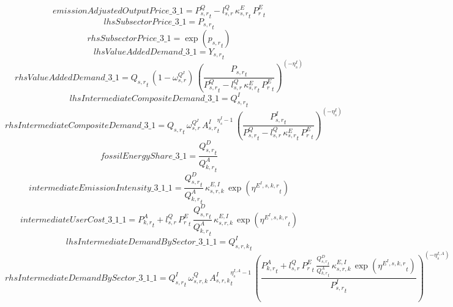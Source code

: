 \begin{dmath*}
emissionAdjustedOutputPrice\_3\_1 = {{P^Q_{s,r}}}_{t}-{{l^{Q}_{s,r}}}\, {{\kappa^{E}_{s,r}}}_{t}\, {{P^E_r}}_{t}
\end{dmath*}
\begin{dmath*}
lhsSubsectorPrice\_3\_1 = {{P_{s,r}}}_{t}
\end{dmath*}
\begin{dmath*}
rhsSubsectorPrice\_3\_1 = \exp\left({{p_{s,r}}}_{t}\right)
\end{dmath*}
\begin{dmath*}
lhsValueAddedDemand\_3\_1 = {{Y_{s,r}}}_{t}
\end{dmath*}
\begin{dmath*}
rhsValueAddedDemand\_3\_1 = {{Q_{s,r}}}_{t}\, \left(1-{{\omega^{Q^{I}}_{s,r}}}\right)\, \left(\frac{{{P_{s,r}}}_{t}}{{{P^Q_{s,r}}}_{t}-{{l^{Q}_{s,r}}}\, {{\kappa^{E}_{s,r}}}_{t}\, {{P^E_r}}_{t}}\right)^{\left(-{{\eta^{I}_{s}}}\right)}
\end{dmath*}
\begin{dmath*}
lhsIntermediateCompositeDemand\_3\_1 = {{Q^{I}_{s,r}}}_{t}
\end{dmath*}
\begin{dmath*}
rhsIntermediateCompositeDemand\_3\_1 = {{Q_{s,r}}}_{t}\, {{\omega^{Q^{I}}_{s,r}}}\, {{A^{I}_{s,r}}}_{t}^{{{\eta^{I}_{s}}}-1}\, \left(\frac{{{P^{I}_{s,r}}}_{t}}{{{P^Q_{s,r}}}_{t}-{{l^{Q}_{s,r}}}\, {{\kappa^{E}_{s,r}}}_{t}\, {{P^E_r}}_{t}}\right)^{\left(-{{\eta^{I}_{s}}}\right)}
\end{dmath*}
\begin{dmath*}
fossilEnergyShare\_3\_1 = \frac{{{Q^{D}_{s,r}}}_{t}}{{{Q^{A}_{k,r}}}_{t}}
\end{dmath*}
\begin{dmath*}
intermediateEmissionIntensity\_3\_1\_1 = \frac{{{Q^{D}_{s,r}}}_{t}}{{{Q^{A}_{k,r}}}_{t}}\, {{\kappa^{E,I}_{s,r,k}}}\, \exp\left({{\eta^{E^{I},s,k,r}}}_{t}\right)
\end{dmath*}
\begin{dmath*}
intermediateUserCost\_3\_1\_1 = {{P^{A}_{k,r}}}_{t}+{{l^{Q}_{s,r}}}\, {{P^E_r}}_{t}\, \frac{{{Q^{D}_{s,r}}}_{t}}{{{Q^{A}_{k,r}}}_{t}}\, {{\kappa^{E,I}_{s,r,k}}}\, \exp\left({{\eta^{E^{I},s,k,r}}}_{t}\right)
\end{dmath*}
\begin{dmath*}
lhsIntermediateDemandBySector\_3\_1\_1 = {{Q^{I}_{s,r,k}}}_{t}
\end{dmath*}
\begin{dmath*}
rhsIntermediateDemandBySector\_3\_1\_1 = {{Q^{I}_{s,r}}}_{t}\, {{\omega^{Q}_{s,r,k}}}\, {{A^{I}_{s,r,k}}}_{t}^{{{\eta^{I,A}_{s}}}-1}\, \left(\frac{{{P^{A}_{k,r}}}_{t}+{{l^{Q}_{s,r}}}\, {{P^E_r}}_{t}\, \frac{{{Q^{D}_{s,r}}}_{t}}{{{Q^{A}_{k,r}}}_{t}}\, {{\kappa^{E,I}_{s,r,k}}}\, \exp\left({{\eta^{E^{I},s,k,r}}}_{t}\right)}{{{P^{I}_{s,r}}}_{t}}\right)^{\left(-{{\eta^{I,A}_{s}}}\right)}
\end{dmath*}
